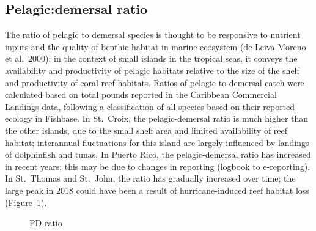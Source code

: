 \documentclass[
  letterpaper,
  oneside,
  open=any]{scrbook}
\begin{document}
\subsection{Pelagic:demersal ratio}\label{pelagicdemersal-ratio}

The ratio of pelagic to demersal species is thought to be responsive to
nutrient inputs and the quality of benthic habitat in marine ecosystem
(de Leiva Moreno et al.~2000); in the context of small islands in the
tropical seas, it conveys the availability and productivity of pelagic
habitats relative to the size of the shelf and productivity of coral
reef habitats. Ratios of pelagic to demersal catch were calculated based
on total pounds reported in the Caribbean Commercial Landings data,
following a classification of all species based on their reported
ecology in Fishbase. In St.~Croix, the pelagic-demersal ratio is much
higher than the other islands, due to the small shelf area and limited
availability of reef habitat; interannual fluctuations for this island
are largely influenced by landings of dolphinfish and tunas. In Puerto
Rico, the pelagic-demersal ratio has increased in recent years; this may
be due to changes in reporting (logbook to e-reporting). In St.~Thomas
and St.~John, the ratio has gradually increased over time; the large
peak in 2018 could have been a result of hurricane-induced reef habitat
loss (Figure~\ref{fig-PD}).

\begin{figure}


\caption{\label{fig-PD}PD ratio}

\end{figure}%
\end{document}
